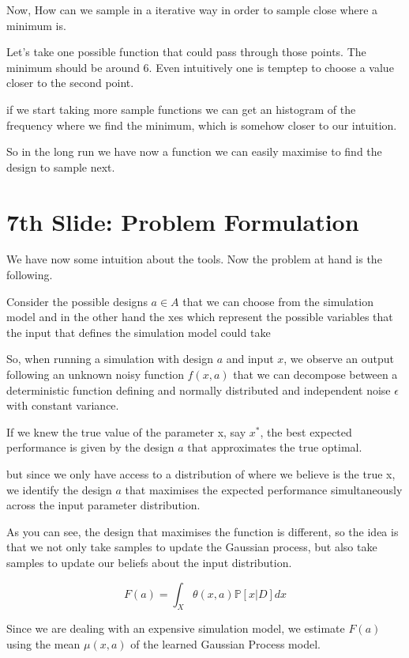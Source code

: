 \documentclass[10pt]{article}
\begin{document}
 Now, How can we sample in a iterative way in order to sample close where a minimum is.
 
 Let's take one possible function that could pass through those points. The minimum should be around 6. Even intuitively one is temptep to choose a value closer to the second point.
 
 if we start taking more sample functions we can get an histogram of the frequency where we find the minimum, which is somehow closer to our intuition.
 
So in the long run we have now a function we can easily maximise to find the design to sample next.

  
\section{7th Slide: Problem Formulation}

We have now some intuition about the tools. Now the problem at hand is the following.

Consider the possible designs $a \in A$ that we can choose from the simulation model and in the other hand the xes which represent the possible variables that the input that defines the simulation model could take

 So, when running a simulation with design $a$ and input $x$, we observe an output following an unknown noisy function $f(x,a)$ that we can decompose between a deterministic function defining  and normally distributed and independent noise $\epsilon$ with constant variance.

 
  If we knew the true value of the parameter x, say $x^{*}$, the best expected performance is given by the design $a$ that approximates the true optimal.

 but since we only have access to a distribution of where we believe is the true x, we identify the design $a$ that maximises the expected performance simultaneously across the input parameter distribution.
 
 As you can see, the design that maximises the function is different, so the idea is that we not only take samples to update the Gaussian process, but also take samples to update our beliefs about the input distribution.
  

\begin{equation}\label{eq:eq1}
F(a)=\int_{X}\theta(x,a)\mathbb{P}[x|D]dx
\end{equation}

 
 Since we are dealing with an expensive simulation model, we estimate $F(a)$ using the mean $\mu(x,a)$ of the learned Gaussian Process model.
 
\end{document}
